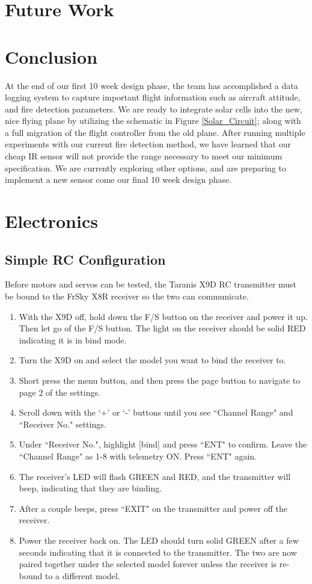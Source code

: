 \documentclass[12pt,journal,compsoc]{IEEEtran}
\begin{document}
\section{Future Work}

\section{Conclusion}
At the end of our first 10 week design phase, the team has accomplished a data logging system to capture important flight information such as aircraft attitude, and fire detection parameters. We are ready to integrate solar cells into the new, nice flying plane by utilizing the schematic in Figure \ref{Solar_Circuit}; along with a full migration of the flight controller from the old plane. After running multiple experiments with our current fire detection method, we have learned that our cheap IR sensor will not provide the range necessary to meet our minimum specification. We are currently exploring other options, and are preparing to implement a new sensor come our final 10 week design phase.

%
%

\appendices
\section{Electronics}
\label{electronics}
\subsection{Simple RC Configuration}
Before motors and servos can be tested, the Taranis X9D RC transmitter must be bound to the FrSky X8R receiver so the two can communicate.
\begin{enumerate}
\item With the X9D off, hold down the F/S button on the receiver and power it up. Then let go of the F/S button. The light on the receiver should be solid RED indicating it is in bind mode.
\item Turn the X9D on and select the model you want to bind the receiver to.
\item Short press the menu button, and then press the page button to navigate to page 2 of the settings.
\item Scroll down with the `+' or `-' buttons until you see ``Channel Range" and ``Receiver No." settings.
\item Under ``Receiver No.", highlight [bind] and press ``ENT" to confirm. Leave the ``Channel Range" as 1-8 with telemetry ON. Press ``ENT" again.
\item The receiver's LED will flash GREEN and RED, and the transmitter will beep, indicating that they are binding.
\item After a couple beeps, press ``EXIT" on the transmitter and power off the receiver.
\item Power the receiver back on. The LED should turn solid GREEN after a few seconds indicating that it is connected to the transmitter. The two are now paired together under the selected model forever unless the receiver is re-bound to a different model.
\end{enumerate}
\end{document}
